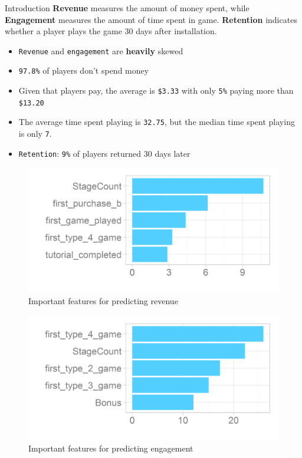 \documentclass[final,size=a3]{beamer}
\newlength{\onecolwid}
\begin{document}
\begin{frame}[t]
\begin{columns}[t]
\begin{column}{\onecolwid}
\begin{block}{Introduction}
\vspace{10mm}
\textbf{Revenue} measures the amount of money spent, while \textbf{Engagement} measures the amount of time spent in game. \textbf{Retention} indicates whether a player plays the game 30 days after installation.

\begin{itemize}
\item \texttt{Revenue} and \texttt{engagement} are \textbf{heavily} skewed
\item \texttt{97.8\%} of players don't spend money
\item Given that players pay, the average is \texttt{\$3.33} with only \texttt{5\%} paying more than \texttt{\$13.20}
\item The average time spent playing is \texttt{32.75}, but the median time spent playing is only \texttt{7}.
\item \texttt{Retention}: \texttt{9\%} of players returned 30 days later
\end{itemize}

\vspace{-5mm}
\begin{figure}
\caption{Important features for predicting revenue}
\includegraphics[width=0.9\linewidth]{images/Revenue_Feature_Importance}
\vspace{-5mm}
\end{figure}

\vspace{-15mm}
\begin{figure}
\caption{Important features for predicting engagement}
\includegraphics[width=0.9\linewidth]{images/Engagement_Feature_Importance}
\vspace{-5mm}
\end{figure}


\end{block}
\end{column}
\end{columns}
\end{frame}
\end{document}
